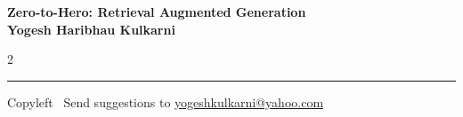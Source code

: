 \documentclass[8pt,landscape]{article}
\begin{document}
\footnotesize


\begin{center}
\Large{\textbf{Zero-to-Hero: Retrieval Augmented Generation\\ Yogesh Haribhau Kulkarni}}
\end{center}

\begin{multicols}{2}

\end{multicols}

\rule{\linewidth}{0.25pt}
\scriptsize
Copyleft \textcopyleft\  Send suggestions to
\href{http://www.yogeshkulkarni.com}{yogeshkulkarni@yahoo.com}
\end{document}
